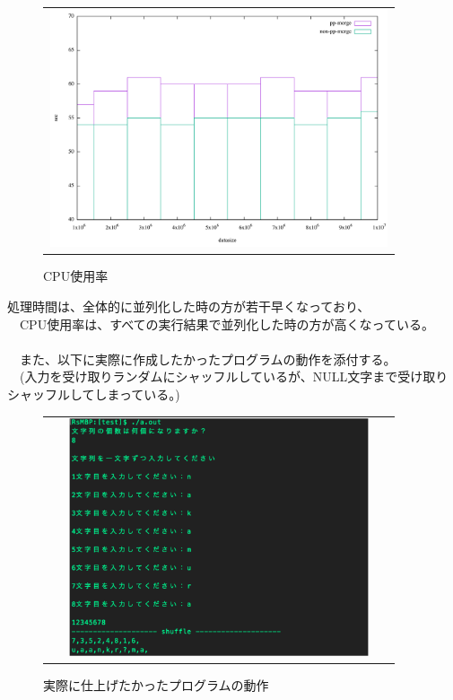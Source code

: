 \documentclass[11pt,a4paper]{jsarticle}
\begin{document}
\newpage
\begin{figure}[htbp]
 \begin{tabular}{c}
  \begin{minipage}{0.5\hsize}
   \begin{center}
   \includegraphics[width=10cm,height=7cm,angle=0]{cpu_graph.pdf}
   \caption{CPU使用率}
   \end{center}
  \end{minipage}
 \end{tabular}
\end{figure}
処理時間は、全体的に並列化した時の方が若干早くなっており、\\
　CPU使用率は、すべての実行結果で並列化した時の方が高くなっている。\\
\\
　また、以下に実際に作成したかったプログラムの動作を添付する。\\
　(入力を受け取りランダムにシャッフルしているが、NULL文字まで受け取りシャッフルしてしまっている。)
\begin{figure}[htbp]
 \begin{tabular}{c}
  \begin{minipage}{0.5\hsize}
   \begin{center}
   \includegraphics[width=10cm,height=7cm,angle=0]{image4-crop.pdf}
   \caption{実際に仕上げたかったプログラムの動作}
   \end{center}
  \end{minipage}
 \end{tabular}
\end{figure}
\end{document}

